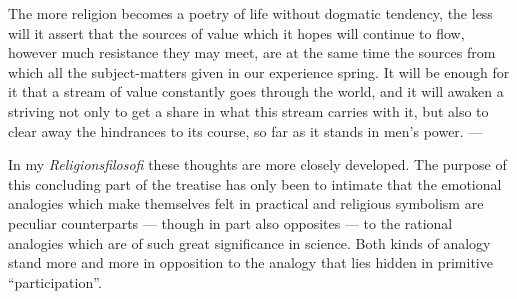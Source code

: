 \documentclass[12pt]{book}
\newcommand{\opage}[1]{\marginnote{\footnotesize\textit{[#1]}}}
\begin{document}
The more religion becomes a poetry of life without dogmatic tendency, the less will
it assert that the sources of value which it hopes will continue to flow, however
much resistance they may meet, are at the same time the sources from which all the
subject-matters given in our experience spring. It will be enough for it that a
stream of value constantly goes through the world, and it will awaken a striving not
only to get a share in what this stream carries with it, but also to clear away the
hindrances to its course, so far as it stands in men's power. ---

\opage{137}In my \textit{Religionsfilosofi} these thoughts are more closely developed. The
purpose of this concluding part of the treatise has only been to intimate that the
emotional analogies which make themselves felt in practical and religious symbolism
are peculiar counterparts --- though in part also opposites --- to the rational
analogies which are of such great significance in science. Both kinds of analogy
stand more and more in opposition to the analogy that lies hidden in primitive
``participation''.
\end{document}
